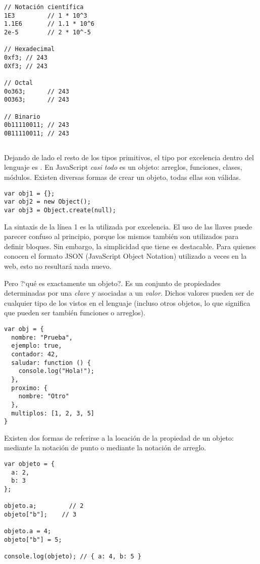 \begin{lstlisting}
// Notación científica
1E3			// 1 * 10^3
1.1E6		// 1.1 * 10^6
2e-5		// 2 * 10^-5

// Hexadecimal
0xf3; // 243
0Xf3; // 243

// Octal
0o363;		// 243
0O363;		// 243

// Binario
0b11110011;	// 243
0B11110011; // 243
\end{lstlisting}

\subsection{}

Dejando de lado el resto de los tipos primitivos, el tipo por excelencia dentro del lenguaje es . En JavaScript \textit{casi todo} es un objeto: arreglos, funciones, clases, módulos. Existen diversas formas de crear un objeto, todas ellas son válidas.

\begin{lstlisting}[title={Creando un \code{object}}]
var obj1 = {};
var obj2 = new Object();
var obj3 = Object.create(null);
\end{lstlisting}

La sintaxis de la línea 1 es la utilizada por excelencia. El uso de las llaves \code{\{\}} puede parecer confuso al principio, porque los mismos también son utilizados para definir bloques. Sin embargo, la simplicidad que tiene es destacable. Para quienes conocen el formato JSON (JavaScript Object Notation) utilizado a veces en la web, esto no resultará nada nuevo.

Pero ?`qué es exactamente un objeto?. Es un conjunto de propiedades determinadas por una \textit{clave} y asociadas a un \textit{valor}. Dichos valores pueden ser de cualquier tipo de los vistos en el lenguaje (incluso otros objetos, lo que significa que pueden ser también funciones o arreglos).

\begin{lstlisting}[title={Ejemplo de \code{object}}]
var obj = {
  nombre: "Prueba",
  ejemplo: true,
  contador: 42,
  saludar: function () {
    console.log("Hola!");
  },
  proximo: {
    nombre: "Otro"
  },
  multiplos: [1, 2, 3, 5]
}
\end{lstlisting}

Existen dos formas de referirse a la locación de la propiedad de un objeto: mediante la notación de punto o mediante la notación de arreglo. 

\begin{lstlisting}[title={Notación punto y notación arreglo}]
var objeto = {
  a: 2,
  b: 3
};

objeto.a;		  // 2
objeto["b"];	// 3

objeto.a = 4;
objeto["b"] = 5;

console.log(objeto); //​​​​​ { a: 4, b: 5 }
\end{lstlisting}

